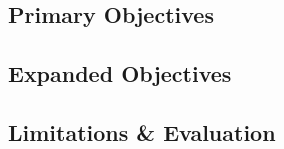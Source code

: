 \subsection{Primary Objectives}


\subsection{Expanded Objectives}


\subsection{Limitations \& Evaluation}